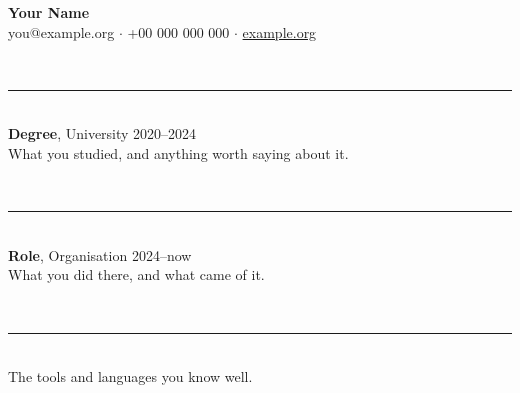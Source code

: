 \documentclass[10pt]{article}
\newcommand{\cvpart}[1]{\vspace{10pt}{\large\bfseries #1}\\[-6pt]\rule{\linewidth}{0.4pt}\\[2pt]}
\newcommand{\entry}[3]{\textbf{#1}, #2 \hfill #3\\}
\begin{document}
{\LARGE\bfseries Your Name}\\[4pt]
you@example.org \quad $\cdot$ \quad +00 000 000 000 \quad $\cdot$ \quad \href{https://example.org}{example.org}

\cvpart{Education}
\entry{Degree}{University}{2020--2024}
What you studied, and anything worth saying about it.

\cvpart{Experience}
\entry{Role}{Organisation}{2024--now}
What you did there, and what came of it.

\cvpart{Skills}
The tools and languages you know well.
\end{document}
